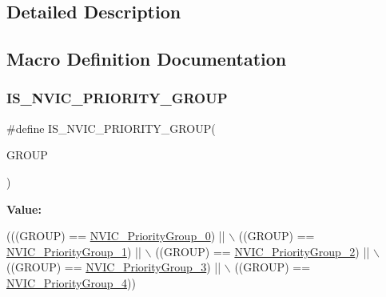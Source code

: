 \subsection{Detailed Description}


\subsection{Macro Definition Documentation}
\mbox{\label{group___m_i_s_c___preemption___priority___group_ga6569304a39fe4f91bd59b6a586c8ede9}} 
\subsubsection{\texorpdfstring{I\+S\+\_\+\+N\+V\+I\+C\+\_\+\+P\+R\+I\+O\+R\+I\+T\+Y\+\_\+\+G\+R\+O\+UP}{IS\_NVIC\_PRIORITY\_GROUP}}
{\footnotesize\ttfamily \#define I\+S\+\_\+\+N\+V\+I\+C\+\_\+\+P\+R\+I\+O\+R\+I\+T\+Y\+\_\+\+G\+R\+O\+UP(\begin{DoxyParamCaption}\item[{}]{G\+R\+O\+UP }\end{DoxyParamCaption})}

{\bfseries Value\+:}
\begin{DoxyCode}
(((GROUP) == \hyperlink{group___m_i_s_c___preemption___priority___group_gaeac0cf537f65d17bc19aee2410b2b60e}{NVIC\_PriorityGroup\_0}) || \(\backslash\)
                                       ((GROUP) == \hyperlink{group___m_i_s_c___preemption___priority___group_ga89bf0bf9e70f1a372a541b1b8d7493aa}{NVIC\_PriorityGroup\_1}) || \(\backslash\)
                                       ((GROUP) == \hyperlink{group___m_i_s_c___preemption___priority___group_ga505002e8b76aef65499ca371e40ec8b4}{NVIC\_PriorityGroup\_2}) || \(\backslash\)
                                       ((GROUP) == \hyperlink{group___m_i_s_c___preemption___priority___group_ga49bdbee77d4a70339d63c80462d49b4d}{NVIC\_PriorityGroup\_3}) || \(\backslash\)
                                       ((GROUP) == \hyperlink{group___m_i_s_c___preemption___priority___group_gaf9020c585da2a299328f0b06dee391a2}{NVIC\_PriorityGroup\_4}))
\end{DoxyCode}


